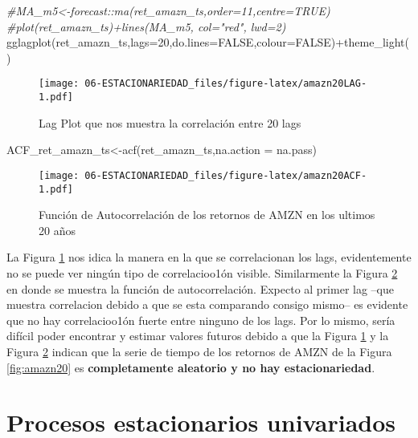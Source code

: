 \documentclass[
]{book}
\newenvironment{Shaded}{\begin{snugshade}}{\end{snugshade}}
\newcommand{\AttributeTok}[1]{\textcolor[rgb]{0.77,0.63,0.00}{#1}}
\newcommand{\CommentTok}[1]{\textcolor[rgb]{0.56,0.35,0.01}{\textit{#1}}}
\newcommand{\ConstantTok}[1]{\textcolor[rgb]{0.00,0.00,0.00}{#1}}
\newcommand{\DecValTok}[1]{\textcolor[rgb]{0.00,0.00,0.81}{#1}}
\newcommand{\FunctionTok}[1]{\textcolor[rgb]{0.00,0.00,0.00}{#1}}
\newcommand{\NormalTok}[1]{#1}
\newcommand{\OtherTok}[1]{\textcolor[rgb]{0.56,0.35,0.01}{#1}}
\newcommand{\SpecialCharTok}[1]{\textcolor[rgb]{0.00,0.00,0.00}{#1}}
\begin{document}
\begin{Shaded}
\begin{Highlighting}[]
\CommentTok{\#MA\_m5\textless{}{-}forecast::ma(ret\_amazn\_ts,order=11,centre=TRUE)}
\CommentTok{\#plot(ret\_amazn\_ts)+lines(MA\_m5, col="red", lwd=2)}
\FunctionTok{gglagplot}\NormalTok{(ret\_amazn\_ts,}\AttributeTok{lags=}\DecValTok{20}\NormalTok{,}\AttributeTok{do.lines=}\ConstantTok{FALSE}\NormalTok{,}\AttributeTok{colour=}\ConstantTok{FALSE}\NormalTok{)}\SpecialCharTok{+}\FunctionTok{theme\_light}\NormalTok{()}
\end{Highlighting}
\end{Shaded}

\begin{figure}
\centering
\texttt{[image: 06-ESTACIONARIEDAD\_files/figure-latex/amazn20LAG-1.pdf]}
\caption{\label{fig:amazn20LAG}Lag Plot que nos muestra la correlación entre 20 lags}
\end{figure}

\begin{Shaded}
\begin{Highlighting}[]
\NormalTok{ACF\_ret\_amazn\_ts}\OtherTok{\textless{}{-}}\FunctionTok{acf}\NormalTok{(ret\_amazn\_ts,}\AttributeTok{na.action =}\NormalTok{ na.pass)}
\end{Highlighting}
\end{Shaded}

\begin{figure}
\centering
\texttt{[image: 06-ESTACIONARIEDAD\_files/figure-latex/amazn20ACF-1.pdf]}
\caption{\label{fig:amazn20ACF}Función de Autocorrelación de los retornos de AMZN en los ultimos 20 años}
\end{figure}

La Figura \ref{fig:amazn20LAG} nos idica la manera en la que se
correlacionan los lags, evidentemente no se puede ver ningún tipo de
correlacioo1ón visible. Similarmente la Figura \ref{fig:amazn20ACF} en
donde se muestra la función de autocorrelación. Expecto al primer lag
--que muestra correlacion debido a que se esta comparando consigo
mismo-- es evidente que no hay correlacioo1ón fuerte entre ninguno de
los lags. Por lo mismo, sería difícil poder encontrar y estimar valores
futuros debido a que la Figura \ref{fig:amazn20LAG} y la Figura
\ref{fig:amazn20ACF} indican que la serie de tiempo de los retornos de
AMZN de la Figura \ref{fig:amazn20} es \textbf{completamente aleatorio y no
hay estacionariedad}.

\hypertarget{procesos-estacionarios-univariados}{%
\chapter{Procesos estacionarios univariados}\label{procesos-estacionarios-univariados}}
\end{document}
